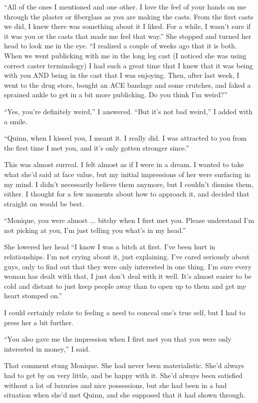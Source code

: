 ``All of the ones I mentioned and one other. I love the feel of your hands on me through
the plaster or fiberglass as you are making the casts. From the first casts we did, I knew there
was something about it I liked. For a while, I wasn't sure if it was you or the casts that made
me feel that way.'' She stopped and turned her head to look me in the eye. ``I realized a couple
of weeks ago that it is both. When we went publicking with me in the long leg cast (I noticed
she was using correct caster terminology) I had such a great time that I knew that it was being
with you AND being in the cast that I was enjoying. Then, after last week, I went to the drug
store, bought an ACE bandage and some crutches, and faked a sprained ankle to get in a bit more
publicking. Do you think I'm weird?''

``Yes, you're definitely weird,'' I answered. ``But it's not bad weird,'' I added with a
smile.

``Quinn, when I kissed you, I meant it. I really did. I was attracted to you from the
first time I met you, and it's only gotten stronger since.''

This was almost surreal. I felt almost as if I were in a dream. I wanted to take what she'd
said at face value, but my initial impressions of her were surfacing in my mind. I didn't
necessarily believe them anymore, but I couldn't dismiss them, either. I thought for a few
moments about how to approach it, and decided that straight on would be best.

``Monique, you were almost $\ldots$ bitchy when I first met you. Please understand I'm not
picking at you, I'm just telling you what's in my head.''

She lowered her head ``I know I was a bitch at first. I've been hurt in relationships. I'm
not crying about it, just explaining. I've cared seriously about guys, only to find out that
they were only interested in one thing. I'm sure every woman has dealt with that, I just don't
deal with it well. It's almost easier to be cold and distant to just keep people away than to
open up to them and get my heart stomped on.''

I could certainly relate to feeling a need to conceal one's true self, but I had to press
her a bit further.

``You also gave me the impression when I first met you that you were only interested in
money,'' I said.

\begin{thought}
That comment stung Monique. She had never been materialistic. She'd always had to get by on
very little, and be happy with it. She'd always been satisfied without a lot of luxuries and
nice possessions, but she had been in a bad situation when she'd met Quinn, and she supposed
that it had shown through.
\end{thought}

